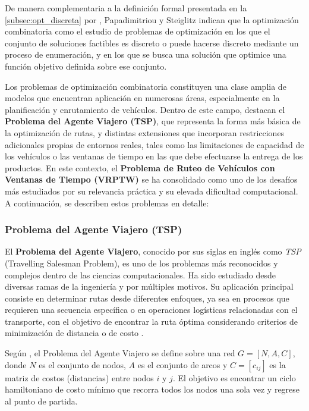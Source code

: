 \documentclass[12pt,titlepage,twoside,openright]{book}
\begin{document}
De manera complementaria a la definición formal presentada en la \autoref{subsec:opt_discreta} por \citep{cobos2010}, Papadimitriou y Steiglitz \citep{papadimitriou1998} indican que la optimización combinatoria como el estudio de problemas de optimización en los que el conjunto de soluciones factibles es discreto o puede hacerse discreto mediante un proceso de enumeración, y en los que se busca una solución que optimice una función objetivo definida sobre ese conjunto.

Los problemas de optimización combinatoria constituyen una clase amplia de modelos que encuentran aplicación en numerosas áreas, especialmente en la planificación y enrutamiento de vehículos. Dentro de este campo, destacan el \textbf{Problema del Agente Viajero (TSP)}, que representa la forma más básica de la optimización de rutas, y distintas extensiones que incorporan restricciones adicionales propias de entornos reales, tales como las limitaciones de capacidad de los vehículos o las ventanas de tiempo en las que debe efectuarse la entrega de los productos. En este contexto, el \textbf{Problema de Ruteo de Vehículos con Ventanas de Tiempo (VRPTW)} se ha consolidado como uno de los desafíos más estudiados por su relevancia práctica y su elevada dificultad computacional. A continuación, se describen estos problemas en detalle:


\subsubsection{Problema del Agente Viajero (TSP)}
\label{subsec:problem_tsp}

El \textbf{Problema del Agente Viajero}, conocido por sus siglas en inglés como \textit{TSP} (Travelling Salesman Problem), es uno de los problemas más reconocidos y complejos dentro de las ciencias computacionales. Ha sido estudiado desde diversas ramas de la ingeniería y por múltiples motivos. Su aplicación principal consiste en determinar rutas desde diferentes enfoques, ya sea en procesos que requieren una secuencia específica o en operaciones logísticas relacionadas con el transporte, con el objetivo de encontrar la ruta óptima considerando criterios de minimización de distancia o de costo \citep{lopez2014tabu}.

Según \citep{torres2018}, el Problema del Agente Viajero se define sobre una red \(G = [N,A,C]\), donde \(N\) es el conjunto de nodos, \(A\) es el conjunto de arcos y \(C = [c_{ij}]\) es la matriz de costos (distancias) entre nodos \(i\) y \(j\). El objetivo es encontrar un ciclo hamiltoniano de costo mínimo que recorra todos los nodos una sola vez y regrese al punto de partida.
\end{document}
